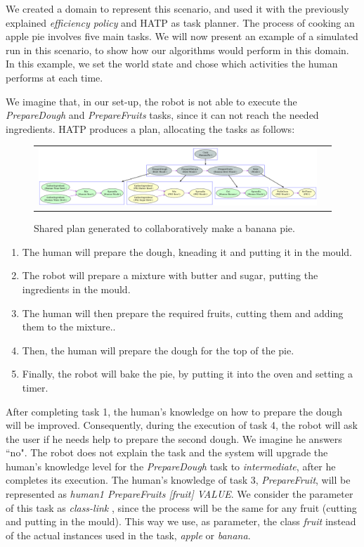 We created a domain to represent this scenario, and used it with the previously explained \textit{efficiency policy} and HATP as task planner. The process of cooking an apple pie involves five main tasks. We will now present an example of a simulated run in this scenario, to show how our algorithms would perform in this domain. In this example, we set the world state and chose which activities the human performs at each time.

 We imagine that, in our set-up, the robot is not able to execute the \textit{PrepareDough} and \textit{PrepareFruits} tasks, since it can not reach the needed ingredients. HATP produces a plan, allocating the tasks as follows:

\afterpage{\clearpage}
\begin{figure}
 \centering
 \begin{tabular}{cc}
  \includegraphics[scale=0.4]{img/teacher/bananaPie.pdf}
 \end{tabular}
 \caption{Shared plan generated to collaboratively make a banana pie.}
 \label{fig:teacher_results-bananaPlan}
 \end{figure}
 

\begin{enumerate}
\item The human will prepare the dough, kneading it and putting it in the mould.
\item The robot will prepare a mixture with butter and sugar, putting the ingredients in the mould.
\item The human will then prepare the required fruits, cutting them and adding them to the mixture..
\item Then, the human will prepare the dough for the top of the pie.
\item Finally, the robot will bake the pie, by putting it into the oven and setting a timer.
\end{enumerate} 

After completing task 1, the human's knowledge on how to prepare the dough will be improved. Consequently, during the execution of task 4, the robot will ask the user if he needs help to prepare the second dough. We imagine he answers ``no". The robot does not explain the task  and the system will upgrade the human's knowledge level for the \textit{PrepareDough} task to  \textit{intermediate}, after he completes its execution. The human's knowledge of task 3, \textit{PrepareFruit}, will be represented as \textit{human1 PrepareFruits [fruit] VALUE}. We consider the parameter of this task as \textit{class-link} , since the process will be the same for any fruit (cutting and putting in the mould). This way we use, as parameter, the class \textit{fruit} instead of the actual instances used in the task, \textit{apple} or \textit{banana}.


